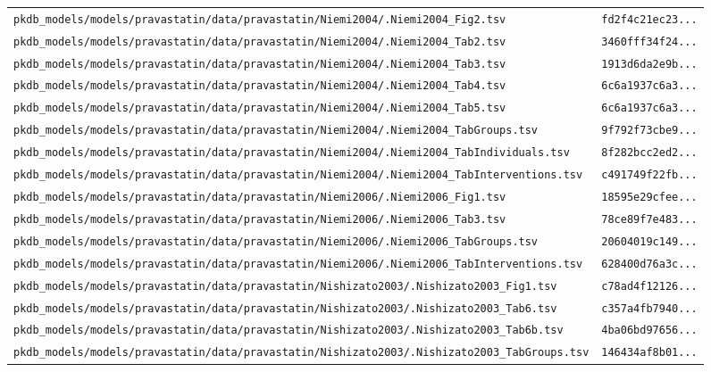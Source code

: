 \begin{longtable}{ll}
\texttt{pkdb\_models/models/pravastatin/data/pravastatin/Niemi2004/.Niemi2004\_Fig2.tsv} & \texttt{fd2f4c21ec23...} \\
\texttt{pkdb\_models/models/pravastatin/data/pravastatin/Niemi2004/.Niemi2004\_Tab2.tsv} & \texttt{3460fff34f24...} \\
\texttt{pkdb\_models/models/pravastatin/data/pravastatin/Niemi2004/.Niemi2004\_Tab3.tsv} & \texttt{1913d6da2e9b...} \\
\texttt{pkdb\_models/models/pravastatin/data/pravastatin/Niemi2004/.Niemi2004\_Tab4.tsv} & \texttt{6c6a1937c6a3...} \\
\texttt{pkdb\_models/models/pravastatin/data/pravastatin/Niemi2004/.Niemi2004\_Tab5.tsv} & \texttt{6c6a1937c6a3...} \\
\texttt{pkdb\_models/models/pravastatin/data/pravastatin/Niemi2004/.Niemi2004\_TabGroups.tsv} & \texttt{9f792f73cbe9...} \\
\texttt{pkdb\_models/models/pravastatin/data/pravastatin/Niemi2004/.Niemi2004\_TabIndividuals.tsv} & \texttt{8f282bcc2ed2...} \\
\texttt{pkdb\_models/models/pravastatin/data/pravastatin/Niemi2004/.Niemi2004\_TabInterventions.tsv} & \texttt{c491749f22fb...} \\
\texttt{pkdb\_models/models/pravastatin/data/pravastatin/Niemi2006/.Niemi2006\_Fig1.tsv} & \texttt{18595e29cfee...} \\
\texttt{pkdb\_models/models/pravastatin/data/pravastatin/Niemi2006/.Niemi2006\_Tab3.tsv} & \texttt{78ce89f7e483...} \\
\texttt{pkdb\_models/models/pravastatin/data/pravastatin/Niemi2006/.Niemi2006\_TabGroups.tsv} & \texttt{20604019c149...} \\
\texttt{pkdb\_models/models/pravastatin/data/pravastatin/Niemi2006/.Niemi2006\_TabInterventions.tsv} & \texttt{628400d76a3c...} \\
\texttt{pkdb\_models/models/pravastatin/data/pravastatin/Nishizato2003/.Nishizato2003\_Fig1.tsv} & \texttt{c78ad4f12126...} \\
\texttt{pkdb\_models/models/pravastatin/data/pravastatin/Nishizato2003/.Nishizato2003\_Tab6.tsv} & \texttt{c357a4fb7940...} \\
\texttt{pkdb\_models/models/pravastatin/data/pravastatin/Nishizato2003/.Nishizato2003\_Tab6b.tsv} & \texttt{4ba06bd97656...} \\
\texttt{pkdb\_models/models/pravastatin/data/pravastatin/Nishizato2003/.Nishizato2003\_TabGroups.tsv} & \texttt{146434af8b01...} \\

\end{longtable}
